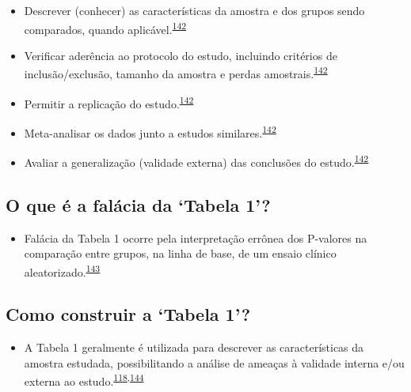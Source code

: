 \documentclass[
  a4paper,
]{book}
\providecommand{\tightlist}{%
  \setlength{\itemsep}{0pt}\setlength{\parskip}{0pt}}
\begin{document}
\begin{itemize}
\item
  Descrever (conhecer) as características da amostra e dos grupos sendo comparados, quando aplicável.\textsuperscript{\protect\hyperlink{ref-chen2020}{142}}
\item
  Verificar aderência ao protocolo do estudo, incluindo critérios de inclusão/exclusão, tamanho da amostra e perdas amostrais.\textsuperscript{\protect\hyperlink{ref-chen2020}{142}}
\item
  Permitir a replicação do estudo.\textsuperscript{\protect\hyperlink{ref-chen2020}{142}}
\item
  Meta-analisar os dados junto a estudos similares.\textsuperscript{\protect\hyperlink{ref-chen2020}{142}}
\item
  Avaliar a generalização (validade externa) das conclusões do estudo.\textsuperscript{\protect\hyperlink{ref-chen2020}{142}}
\end{itemize}

\hypertarget{o-que-uxe9-a-faluxe1cia-da-tabela-1}{%
\subsection{O que é a falácia da `Tabela 1'?}\label{o-que-uxe9-a-faluxe1cia-da-tabela-1}}

\begin{itemize}
\tightlist
\item
  Falácia da Tabela 1 ocorre pela interpretação errônea dos P-valores na comparação entre grupos, na linha de base, de um ensaio clínico aleatorizado.\textsuperscript{\protect\hyperlink{ref-pijls2022}{143}}
\end{itemize}

\hypertarget{como-construir-a-tabela-1}{%
\subsection{Como construir a `Tabela 1'?}\label{como-construir-a-tabela-1}}

\begin{itemize}
\tightlist
\item
  A Tabela 1 geralmente é utilizada para descrever as características da amostra estudada, possibilitando a análise de ameaças à validade interna e/ou externa ao estudo.\textsuperscript{\protect\hyperlink{ref-greenhalgh1997}{118},\protect\hyperlink{ref-Hayes-Larson2019}{144}}
\end{itemize}
\end{document}
